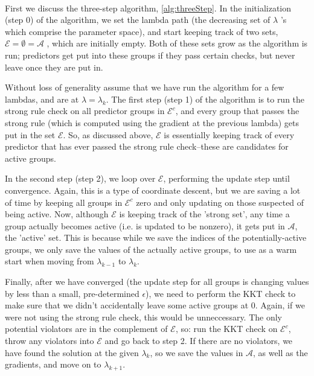 \documentclass[titlepage]{article}
\begin{document}
\

First we discuss the three-step algorithm, \autoref{alg:threeStep}. In the initialization (step 0) of the algorithm, we set the lambda path (the decreasing set of $\lambda$ 's which comprise the parameter space), and start keeping track of two sets, $\mathcal{E} = \emptyset = \mathcal{A}$ , which are initially empty. Both of these sets grow as the algorithm is run; predictors get put into these groups if they pass certain checks, but never leave once they are put in.

Without loss of generality assume that we have run the algorithm for a few lambdas, and are at $\lambda = \lambda_{k}$. The first step (step 1) of the algorithm is to run the strong rule check on all predictor groups in $\mathcal{E}^c$, and every group that passes the strong rule (which is computed using the gradient at the previous lambda) gets put in the set $\mathcal{E}$. So, as discussed above, $\mathcal{E}$ is essentially keeping track of every predictor that has ever passed the strong rule check--these are candidates for active groups.

In the second step (step 2), we loop over $\mathcal{E}$, performing the update step until convergence. Again, this is a type of coordinate descent, but we are saving a lot of time by keeping all groups in $\mathcal{E}^c$ zero and only updating on those suspected of being active. Now, although $\mathcal{E}$ is keeping track of the 'strong set', any time a group actually becomes active (i.e. is updated to be nonzero), it gets put in $\mathcal{A}$, the 'active' set. This is because while we save the indices of the potentially-active groups, we only save the values of the actually active groups, to use as a warm start when moving from $\lambda_{k-1}$ to $\lambda_k$.

Finally, after we have converged (the update step for all groups is changing values by less than a small, pre-determined $\epsilon$), we need to perform the KKT check to make sure that we didn't accidentally leave some active groups at 0. Again, if we were not using the strong rule check, this would be unneccessary. The only potential violators are in the complement of $\mathcal{E}$, so: run the KKT check on $\mathcal{E}^c$, throw any violators into $\mathcal{E}$ and go back to step 2. If there are no violators, we have found the solution at the given $\lambda_k$, so we save the values in $\mathcal{A}$, as well as the gradients, and move on to $\lambda_{k+1}$.

\
\end{document}
